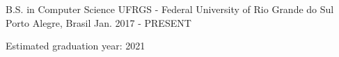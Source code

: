 \begin{cventries}
  \cventry
    {B.S. in Computer Science}
    {UFRGS - Federal University of Rio Grande do Sul}
    {Porto Alegre, Brasil}
    {Jan. 2017 - PRESENT}
    {
      \begin{cvitems}
        \item {Estimated graduation year: 2021}
      \end{cvitems}
    }
\end{cventries}


